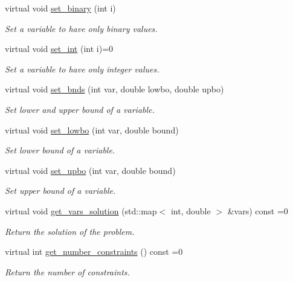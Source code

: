 \begin{DoxyCompactItemize}
virtual void \hyperlink{classmeilp__solver_aef8ccf0980800a5b87d60b7fd030822e}{set\+\_\+binary} (int i)
\begin{DoxyCompactList}\small\item\em Set a variable to have only binary values. \end{DoxyCompactList}\item 
virtual void \hyperlink{classmeilp__solver_aa9d0154f8daf67a0d815b76c6739546a}{set\+\_\+int} (int i)=0
\begin{DoxyCompactList}\small\item\em Set a variable to have only integer values. \end{DoxyCompactList}\item 
virtual void \hyperlink{classmeilp__solver_a76c7f0f92e4a828baa788493600ed6ff}{set\+\_\+bnds} (int var, double lowbo, double upbo)
\begin{DoxyCompactList}\small\item\em Set lower and upper bound of a variable. \end{DoxyCompactList}\item 
virtual void \hyperlink{classmeilp__solver_a3832e317cd19888528a0797f87f40051}{set\+\_\+lowbo} (int var, double bound)
\begin{DoxyCompactList}\small\item\em Set lower bound of a variable. \end{DoxyCompactList}\item 
virtual void \hyperlink{classmeilp__solver_ab6329596a134f01a88802c37bf3aee0b}{set\+\_\+upbo} (int var, double bound)
\begin{DoxyCompactList}\small\item\em Set upper bound of a variable. \end{DoxyCompactList}\item 
virtual void \hyperlink{classmeilp__solver_a2d89a5dd8ecf6e2e9dc290f7088f05e9}{get\+\_\+vars\+\_\+solution} (std\+::map$<$ int, double $>$ \&vars) const =0
\begin{DoxyCompactList}\small\item\em Return the solution of the problem. \end{DoxyCompactList}\item 
virtual int \hyperlink{classmeilp__solver_a0045d972eeb07fca06d9ac59ef802a86}{get\+\_\+number\+\_\+constraints} () const =0
\begin{DoxyCompactList}\small\item\em Return the number of constraints. \end{DoxyCompactList}\item 

\end{DoxyCompactItemize}
